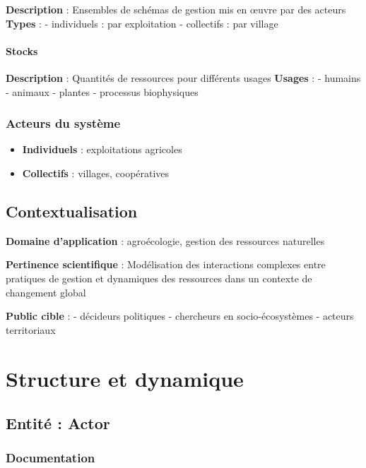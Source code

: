 \documentclass[
]{article}
\providecommand{\tightlist}{%
  \setlength{\itemsep}{0pt}\setlength{\parskip}{0pt}}
\begin{document}
\textbf{Description} : Ensembles de schémas de gestion mis en œuvre par
des acteurs \textbf{Types} : - individuels : par exploitation -
collectifs : par village

\paragraph{Stocks}\label{stocks}

\textbf{Description} : Quantités de ressources pour différents usages
\textbf{Usages} : - humains - animaux - plantes - processus biophysiques

\subsubsection{Acteurs du système}\label{acteurs-du-systuxe8me}

\begin{itemize}
\tightlist
\item
  \textbf{Individuels} : exploitations agricoles
\item
  \textbf{Collectifs} : villages, coopératives
\end{itemize}

\subsection{Contextualisation}\label{contextualisation}

\textbf{Domaine d'application} : agroécologie, gestion des ressources
naturelles

\textbf{Pertinence scientifique} : Modélisation des interactions
complexes entre pratiques de gestion et dynamiques des ressources dans
un contexte de changement global

\textbf{Public cible} : - décideurs politiques - chercheurs en
socio-écosystèmes - acteurs territoriaux

\section{Structure et dynamique}\label{structure-et-dynamique}

\subsection{Entité : Actor}\label{entituxe9-actor}

\subsubsection{Documentation}\label{documentation}
\end{document}
